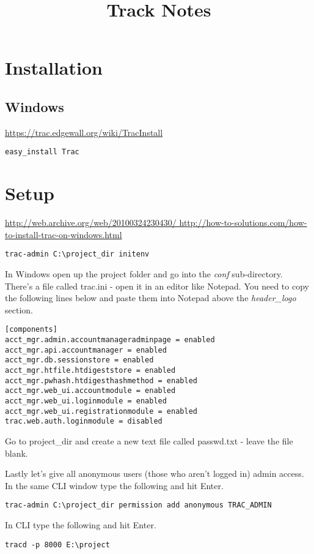 \documentclass{report}
\title{Track Notes}
\begin{document}
\tableofcontents

\chapter{Installation}
\section{Windows}
\url{https://trac.edgewall.org/wiki/TracInstall}

\begin{verbatim}
easy_install Trac
\end{verbatim}

\chapter{Setup}
\url{http://web.archive.org/web/20100324230430/
http://how-to-solutions.com/how-to-install-trac-on-windows.html}

\begin{verbatim}
trac-admin C:\project_dir initenv
\end{verbatim}
 
In Windows open up the project folder and go into the \textit{conf} sub-directory. 
There's a file called trac.ini - open it in an editor like Notepad. You need to copy 
the following lines below and paste them into Notepad above the \textit{header\_logo} section.

\begin{verbatim}
[components]
acct_mgr.admin.accountmanageradminpage = enabled
acct_mgr.api.accountmanager = enabled
acct_mgr.db.sessionstore = enabled
acct_mgr.htfile.htdigeststore = enabled
acct_mgr.pwhash.htdigesthashmethod = enabled
acct_mgr.web_ui.accountmodule = enabled
acct_mgr.web_ui.loginmodule = enabled
acct_mgr.web_ui.registrationmodule = enabled
trac.web.auth.loginmodule = disabled
\end{verbatim}

Go to project\_dir and create a new text file called passwd.txt - leave the file blank.

Lastly let's give all anonymous users (those who aren't logged in) admin access. In the same 
CLI window type the following and hit Enter.
\begin{verbatim}
trac-admin C:\project_dir permission add anonymous TRAC_ADMIN
\end{verbatim}

In CLI type the following and hit Enter.
\begin{verbatim}
tracd -p 8000 E:\project
\end{verbatim}
\end{document}
